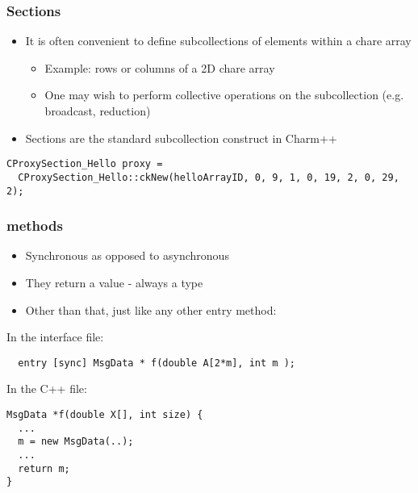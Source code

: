 \begin{frame}[fragile]
\frametitle{Sections}
\begin{itemize}
 \item It is often convenient to define subcollections of elements within a
   chare array
   \begin{itemize}
   \item Example: rows or columns of a 2D chare array
   \item One may wish to perform collective operations on the subcollection
     (e.g. broadcast, reduction)
   \end{itemize}
 \item Sections are the standard subcollection construct in Charm++

\end{itemize}
\begin{lstlisting}
CProxySection_Hello proxy =
  CProxySection_Hello::ckNew(helloArrayID, 0, 9, 1, 0, 19, 2, 0, 29, 2);
\end{lstlisting}
\end{frame}

\begin{frame}[fragile]
\frametitle{ methods}
\begin{itemize}
 \item Synchronous as opposed to asynchronous
 \item They return a value - always a  type
 \item Other than that, just like any other entry method:
\end{itemize}
In the interface file:
\begin{lstlisting}
  entry [sync] MsgData * f(double A[2*m], int m ); 
\end{lstlisting}

In the C++ file:
\begin{lstlisting}
MsgData *f(double X[], int size) {
  ...
  m = new MsgData(..);
  ...
  return m;
}
\end{lstlisting}
\end{frame}


